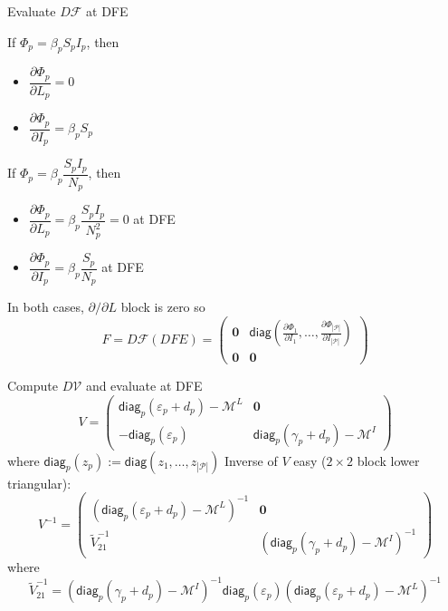 \documentclass[aspectratio=169]{beamer}\usepackage[]{graphicx}\usepackage[]{xcolor}
\begin{document}
\begin{frame}{Evaluate $D\mathcal{F}$ at DFE}
	\begin{minipage}[t]{0.45\textwidth}
		If $\Phi_p=\beta_pS_pI_p$, then
		\begin{itemize}
			\item $\dfrac{\partial\Phi_p}{\partial L_p}=0$
			\item $\dfrac{\partial\Phi_p}{\partial I_p}=\beta_pS_p$
		\end{itemize}
	\end{minipage}
	\begin{minipage}[t]{0.45\textwidth}
		If $\Phi_p=\beta_p\dfrac{S_pI_p}{N_p}$, then
		\begin{itemize}
			\item $\dfrac{\partial\Phi_p}{\partial L_p}=\beta_p\dfrac{S_pI_p}{N_p^2}=0$ at DFE
			\item $\dfrac{\partial\Phi_p}{\partial I_p}=\beta_p\dfrac{S_p}{N_p}$ at DFE
		\end{itemize}
	\end{minipage}
	\vfill
In both cases, $\partial/\partial L$ block is zero so
$$
F=D\mathcal{F}(DFE)=
\begin{pmatrix}
\mathbf{0} & \mathsf{diag}\left(
\frac{\partial\Phi_1}{\partial I_1},\ldots,\frac{\partial\Phi_{|\mathcal{P}|}}{\partial I_{|\mathcal{P}|}}\right) \\
\mathbf{0} & \mathbf{0}
\end{pmatrix}
$$
\end{frame}

\begin{frame}{Compute $D\mathcal{V}$ and evaluate at DFE}
$$
V=
\begin{pmatrix}
\mathsf{diag}_p(\varepsilon_p+d_p)-\mathcal{M}^L & \mathbf{0} \\
-\mathsf{diag}_p(\varepsilon_p) & \mathsf{diag}_p(\gamma_p+d_p)-\mathcal{M}^I
\end{pmatrix}
$$
where $\mathsf{diag}_p(z_p):=\mathsf{diag}(z_1,\ldots,z_{|\mathcal{P}|})$
\vfill
Inverse of $V$ easy ($2\times 2$ block lower triangular):
$$
V^{-1}
=
\begin{pmatrix}
\left(\mathsf{diag}_p(\varepsilon_p+d_p)-\mathcal{M}^L\right)^{-1} & \mathbf{0} \\
\tilde V_{21}^{-1} & \left(\mathsf{diag}_p(\gamma_p+d_p)-\mathcal{M}^I\right)^{-1}
\end{pmatrix}
$$
where
\[
	\tilde V_{21}^{-1}=
	\left(\mathsf{diag}_p(\gamma_p+d_p)-\mathcal{M}^I\right)^{-1}		
	\mathsf{diag}_p(\varepsilon_p)
	\left(\mathsf{diag}_p(\varepsilon_p+d_p)-\mathcal{M}^L\right)^{-1}
\]
\end{frame}
\end{document}
